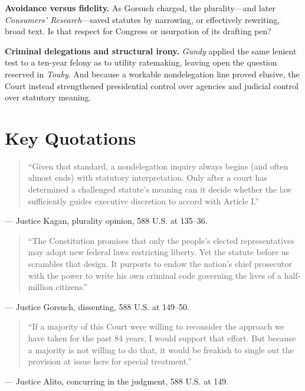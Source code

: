 \documentclass[12pt]{article}
\begin{document}
\textbf{Avoidance versus fidelity.} As Gorsuch charged, the plurality---and later \textit{Consumers' Research}---saved statutes by narrowing, or effectively rewriting, broad text. Is that respect for Congress or usurpation of its drafting pen?

\textbf{Criminal delegations and structural irony.} \textit{Gundy} applied the same lenient test to a ten-year felony as to utility ratemaking, leaving open the question reserved in \textit{Touby}. And because a workable nondelegation line proved elusive, the Court instead strengthened presidential control over agencies and judicial control over statutory meaning.

\section{Key Quotations}

\begin{quote}
``Given that standard, a nondelegation inquiry always begins (and often almost ends) with statutory interpretation. Only after a court has determined a challenged statute's meaning can it decide whether the law sufficiently guides executive discretion to accord with Article I.''
\end{quote}
\noindent --- Justice Kagan, plurality opinion, 588 U.S. at 135--36.

\begin{quote}
``The Constitution promises that only the people's elected representatives may adopt new federal laws restricting liberty. Yet the statute before us scrambles that design. It purports to endow the nation's chief prosecutor with the power to write his own criminal code governing the lives of a half-million citizens.''
\end{quote}
\noindent --- Justice Gorsuch, dissenting, 588 U.S. at 149--50.

\begin{quote}
``If a majority of this Court were willing to reconsider the approach we have taken for the past 84 years, I would support that effort. But because a majority is not willing to do that, it would be freakish to single out the provision at issue here for special treatment.''
\end{quote}
\noindent --- Justice Alito, concurring in the judgment, 588 U.S. at 149.
\end{document}
